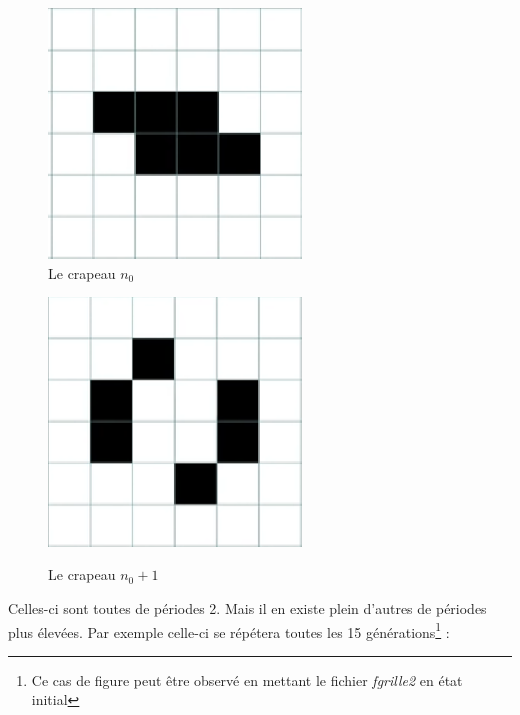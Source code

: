 \documentclass[12,french]{report}
\begin{document}
\begin{figure}[H]
    \begin{minipage}[c]{.46\linewidth}
        \centering
        \includegraphics[width=0.6\textwidth]{./Images/12}\\
        \caption{Le crapeau $n_{0}$}
    \end{minipage}
    \hfill%
    \begin{minipage}[c]{.46\linewidth}
        \centering
        \includegraphics[width=0.6\textwidth]{./Images/12'}\\
        \caption{Le crapeau $n_{0}+1$}
    \end{minipage}
\end{figure}\vspace{0.25cm}

\pagebreak

Celles-ci sont toutes de périodes 2. Mais il en existe plein d'autres de périodes plus élevées. Par exemple celle-ci se répétera toutes les 15 générations\footnote{Ce cas de figure peut être observé en mettant le fichier \textit{fgrille2} en état initial} :  \vspace{0.3cm}
\end{document}
